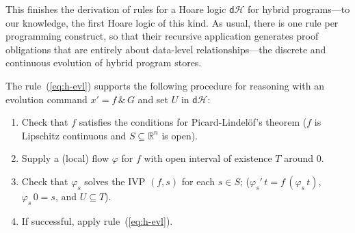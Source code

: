 \documentclass[envcountsame,envcountsect]{llncs}
\newcommand{\dH}{\mathsf{d}\mathcal{H}}
\newcommand{\flow}{\varphi}
\newcommand{\reals}{\mathbb{R}}
\begin{document}
This finishes the derivation of rules for a Hoare logic $\dH$ for
hybrid programs---to our knowledge, the first Hoare logic of this
kind. As usual, there is one rule per programming construct, so that
their recursive application generates proof obligations that are
entirely about data-level relationships---the discrete and continuous
evolution of hybrid program stores.

The rule~(\ref{eq:h-evl}) supports the following procedure
for reasoning with an evolution command $x' = f\, \&\, G$ and set $U$
in $\dH$:
\begin{enumerate}
\item Check that $f$ satisfies the conditions for Picard-Lindel\"of's
  theorem ($f$ is Lipschitz continuous and $S\subseteq\reals^n$ is
  open).
\item Supply a (local) flow $\flow$ for $f$ with open interval of
  existence $T$ around $0$.
\item Check that $\flow_s$ solves the IVP $(f,s)$ for each $s\in S$;
  ($\flow_s'\, t = f\, (\flow_s\, t)$, $\flow_s\, 0 = s$, and
  $U\subseteq T$).
\item If successful, apply rule~(\ref{eq:h-evl}).
\end{enumerate}
\end{document}
